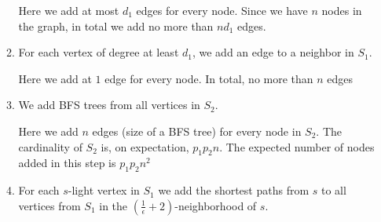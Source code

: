 \documentclass[11pt]{article}
\begin{document}
\begin{enumerate}
\begin{enumerate}
            Here we add at most $d_1$ edges for every node. Since we have $n$ nodes in the graph, in total we add no more than $nd_1$ edges.
            \item For each vertex of degree at least $d_1$, we add an edge to a neighbor in $S_1$.
            
            Here we add at $1$ edge for every node. In total, no more than $n$ edges
            \item We add BFS trees from all vertices in $S_2$.
            
            Here we add $n$ edges (size of a BFS tree) for every node in $S_2$. The cardinality of $S_2$ is, on expectation, $p_1p_2n$. The expected number of nodes added in this step is $p_1p_2n^2$
            \item For each $s$-light vertex in $S_1$ we add the shortest paths from $s$ to all vertices from $S_1$ in the $\left(\frac{1}{\epsilon} + 2\right)$-neighborhood of $s$. 
            

\end{enumerate}
\end{enumerate}
\end{document}
